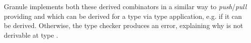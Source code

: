 Granule implements both these derived combinators in a similar
way to \emph{push}/\emph{pull} providing 
and  which can be derived for a type  via type
application, e.g.  if it can be derived.
Otherwise, the type checker produces an error,
explaining why  is not derivable at type .




    
    

